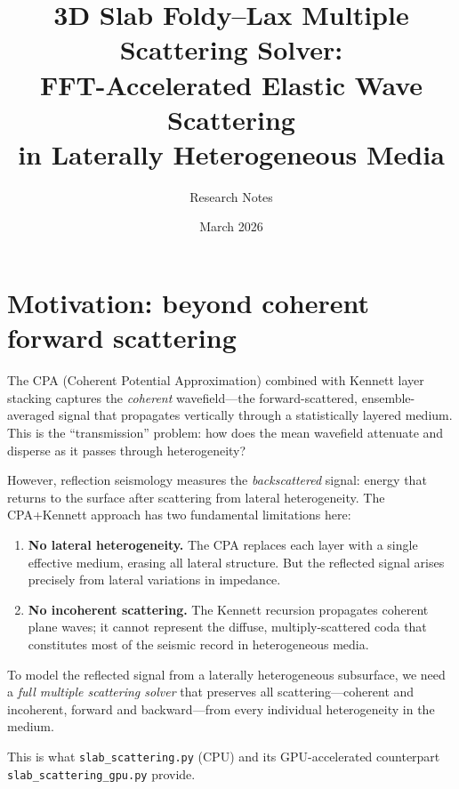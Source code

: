 \documentclass[11pt,a4paper]{article}
\title{3D Slab Foldy--Lax Multiple Scattering Solver:\\
FFT-Accelerated Elastic Wave Scattering\\
in Laterally Heterogeneous Media}
\author{Research Notes}
\date{March 2026}
\begin{document}
\maketitle

\tableofcontents
\vspace{1em}

\section{Motivation: beyond coherent forward scattering}
\label{sec:motivation}

The CPA (Coherent Potential Approximation) combined with Kennett layer
stacking captures the \emph{coherent} wavefield---the forward-scattered,
ensemble-averaged signal that propagates vertically through a
statistically layered medium.  This is the ``transmission'' problem:
how does the mean wavefield attenuate and disperse as it passes
through heterogeneity?

However, reflection seismology measures the \emph{backscattered}
signal: energy that returns to the surface after scattering from lateral
heterogeneity.  The CPA+Kennett approach has two fundamental
limitations here:

\begin{enumerate}[nosep]
  \item \textbf{No lateral heterogeneity.}  The CPA replaces each
    layer with a single effective medium, erasing all lateral
    structure.  But the reflected signal arises precisely from lateral
    variations in impedance.
  \item \textbf{No incoherent scattering.}  The Kennett recursion
    propagates coherent plane waves; it cannot represent the diffuse,
    multiply-scattered coda that constitutes most of the seismic
    record in heterogeneous media.
\end{enumerate}

To model the reflected signal from a laterally heterogeneous
subsurface, we need a \emph{full multiple scattering solver} that
preserves all scattering---coherent and incoherent, forward and
backward---from every individual heterogeneity in the medium.

This is what \texttt{slab\_scattering.py} (CPU) and its
GPU-accelerated counterpart \texttt{slab\_scattering\_gpu.py}
provide.

\end{document}
